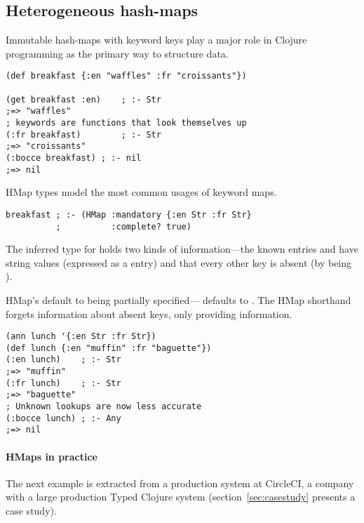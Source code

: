 \subsection{Heterogeneous hash-maps}

Immutable hash-maps with keyword keys play a major role in Clojure programming
as the primary way to structure data.

\begin{verbatim}
(def breakfast {:en "waffles" :fr "croissants"})

(get breakfast :en)    ; :- Str
;=> "waffles"
; keywords are functions that look themselves up
(:fr breakfast)        ; :- Str
;=> "croissants"
(:bocce breakfast) ; :- nil
;=> nil
\end{verbatim}

HMap types model the most common usages of keyword maps.
\begin{verbatim}
breakfast ; :- (HMap :mandatory {:en Str :fr Str}
          ;          :complete? true)
\end{verbatim}
The inferred type for  holds two kinds of information---the known entries 
and  have string values (expressed as a  entry) and that 
every other key is absent (by  being ).

HMap's default to being partially specified--- defaults to . The HMap shorthand 
forgets 
information about absent keys, only providing 
information.

\begin{verbatim}
(ann lunch '{:en Str :fr Str})
(def lunch {:en "muffin" :fr "baguette"})
(:en lunch)    ; :- Str
;=> "muffin"
(:fr lunch)    ; :- Str
;=> "baguette"
; Unknown lookups are now less accurate
(:bocce lunch) ; :- Any
;=> nil
\end{verbatim}

\paragraph{HMaps in practice} The next example is extracted from a production system at CircleCI,
a company with a large production Typed Clojure system
(section~\ref{sec:casestudy} presents a case study).

